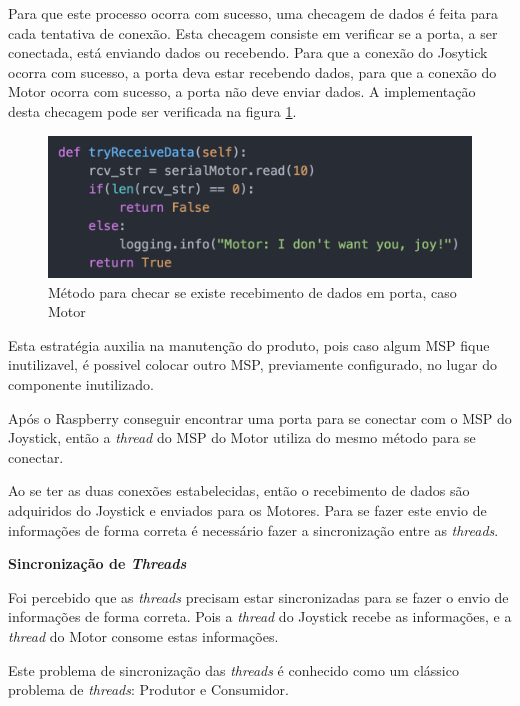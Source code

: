   Para que este processo ocorra com sucesso, uma checagem de dados é feita para cada tentativa de conexão. Esta checagem consiste em verificar se a porta, a ser conectada, está enviando dados ou recebendo. Para que a conexão do Josytick ocorra com sucesso, a porta deva estar recebendo dados, para que a conexão do Motor ocorra com sucesso, a porta não deve enviar dados. A implementação desta checagem pode ser verificada na figura \ref{fig:try_receive_data}.

  \begin{figure}[!htb]
  \centering
  \includegraphics[keepaspectratio=true,scale=0.5]{figuras/resultados/try_receive_data}
  \caption{Método para checar se existe recebimento de dados em porta, caso Motor}
  \label{fig:try_receive_data}
  \end{figure}

  Esta estratégia auxilia na manutenção do produto, pois caso algum MSP fique inutilizavel, é possivel colocar outro MSP, previamente configurado, no lugar do componente inutilizado.

  Após o Raspberry conseguir encontrar uma porta para se conectar com o MSP do Joystick, então a \textit{thread} do MSP do Motor utiliza do mesmo método para se conectar.

  Ao se ter as duas conexões estabelecidas, então o recebimento de dados são adquiridos do Joystick e enviados para os Motores. Para se fazer este envio de informações de forma correta é necessário fazer a sincronização entre as \textit{threads}.

  \textbf{Sincronização de \textit{Threads}}

  Foi percebido que as \textit{threads} precisam estar sincronizadas para se fazer o envio de informações de forma correta. Pois a \textit{thread} do Joystick recebe as informações, e a \textit{thread} do Motor consome estas informações.

  Este problema de sincronização das \textit{threads} é conhecido como um clássico problema de \textit{threads}: Produtor e Consumidor.



